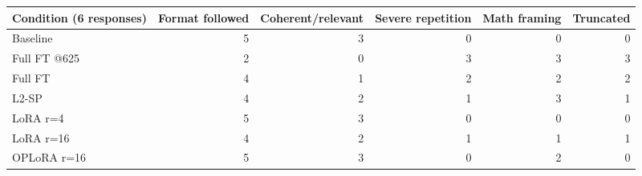 \begin{tabular}{lrrrrr}
\toprule
Condition (6 responses) & Format followed & Coherent/relevant & Severe repetition & Math framing & Truncated \\
\midrule
Baseline & 5 & 3 & 0 & 0 & 0 \\
Full FT @625 & 2 & 0 & 3 & 3 & 3 \\
Full FT & 4 & 1 & 2 & 2 & 2 \\
L2-SP & 4 & 2 & 1 & 3 & 1 \\
LoRA r=4 & 5 & 3 & 0 & 0 & 0 \\
LoRA r=16 & 4 & 2 & 1 & 1 & 1 \\
OPLoRA r=16 & 5 & 3 & 0 & 2 & 0 \\
\bottomrule
\end{tabular}
